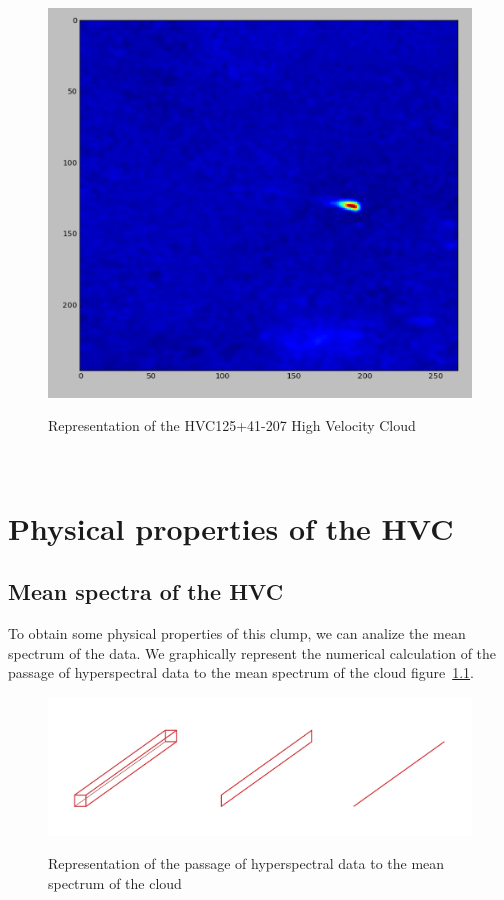 \documentclass[a4paper,10.5pt]{report}
\begin{document}
\begin{figure}[h!]
  \centering
  \includegraphics[width=4.in]{hvc.png}
  \label{fig::hvc}
  \caption{Representation of the HVC125+41-207 High Velocity Cloud}
\end{figure} \\

\chapter{Physical properties of the HVC}
\section{Mean spectra of the HVC}
To obtain some physical properties of this clump, we can analize the mean spectrum of the data.
We graphically represent the numerical calculation of the passage of hyperspectral data to the mean spectrum of the cloud
figure~\ref{fig::spectra}.

\begin{figure}[h!]
  \centering
  \includegraphics[width=6.in]{spectra.png}
  \label{fig::spectra}
  \caption{Representation of the passage of hyperspectral data to the mean spectrum of the cloud}
\end{figure} \\
\end{document}

